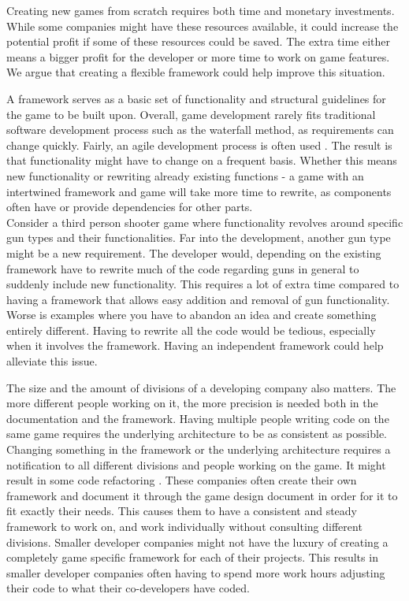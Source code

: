 Creating new games from scratch requires both time and monetary investments. While some companies might have these resources available, it could increase the potential profit if some of these resources could be saved. The extra time either means a bigger profit for the developer or more time to work on game features. We argue that creating a flexible framework could help improve this situation.

A framework serves as a basic set of functionality and structural guidelines for the game to be built upon. Overall, game development rarely fits traditional software development process such as the waterfall method, as requirements can change quickly. Fairly, an agile development process is often used \cite{Gamedevelopment}. The result is that functionality might have to change on a frequent basis. Whether this means new functionality or rewriting already existing functions - a game with an intertwined framework and game will take more time to rewrite, as components often have or provide dependencies for other parts.\\

Consider a third person shooter game where functionality revolves around specific gun types and their functionalities. Far into the development, another gun type might be a new requirement. The developer would, depending on the existing framework have to rewrite much of the code regarding guns in general to suddenly include new functionality. This requires a lot of extra time compared to having a framework that allows easy addition and removal of gun functionality. Worse is examples where you have to abandon an idea and create something entirely different. Having to rewrite all the code would be tedious, especially when it involves the framework. Having an independent framework could help alleviate this issue.

The size and the amount of divisions of a developing company also matters. The more different people working on it, the more precision is needed both in the documentation and the framework. Having multiple people writing code on the same game requires the underlying architecture to be as consistent as possible. Changing something in the framework or the underlying architecture requires a notification to all different divisions and people working on the game. It might result in some code refactoring \cite{Gameprod}. These companies often create their own framework and document it through the game design document \cite{Gamedesign} in order for it to fit exactly their needs. This causes them to have a consistent and steady framework to work on, and work individually without consulting different divisions. Smaller developer companies might not have the luxury of creating a completely game specific framework for each of their projects. This results in smaller developer companies often having to spend more work hours adjusting their code to what their co-developers have coded.

